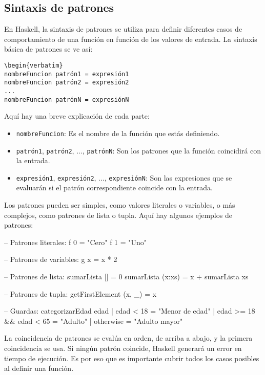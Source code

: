\documentclass{article}
\begin{document}
\subsection{Sintaxis de patrones}

En Haskell, la sintaxis de patrones se utiliza para definir diferentes casos de comportamiento de una función en función de los valores de entrada. La sintaxis básica de patrones se ve así:

\begin{verbatim}
\begin{verbatim}
nombreFuncion patrón1 = expresión1
nombreFuncion patrón2 = expresión2
...
nombreFuncion patrónN = expresiónN
\end{verbatim}

Aquí hay una breve explicación de cada parte:

\begin{itemize}
    \item \texttt{nombreFuncion}: Es el nombre de la función que estás definiendo.
    \item \texttt{patrón1}, \texttt{patrón2}, ..., \texttt{patrónN}: Son los patrones que la función coincidirá con la entrada.
    \item \texttt{expresión1}, \texttt{expresión2}, ..., \texttt{expresiónN}: Son las expresiones que se evaluarán si el patrón correspondiente coincide con la entrada.
\end{itemize}

Los patrones pueden ser simples, como valores literales o variables, o más complejos, como patrones de lista o tupla. Aquí hay algunos ejemplos de patrones:

\begin{haskell}[caption={Ejemplos de patrones en Haskell}]
-- Patrones literales:
f 0 = "Cero"
f 1 = "Uno"

-- Patrones de variables:
g x = x * 2

-- Patrones de lista:
sumarLista [] = 0
sumarLista (x:xs) = x + sumarLista xs

-- Patrones de tupla:
getFirstElement (x, _) = x

-- Guardas:
categorizarEdad edad
    | edad < 18 = "Menor de edad"
    | edad >= 18 && edad < 65 = "Adulto"
    | otherwise = "Adulto mayor"
\end{haskell}

La coincidencia de patrones se evalúa en orden, de arriba a abajo, y la primera coincidencia se usa. Si ningún patrón coincide, Haskell generará un error en tiempo de ejecución. Es por eso que es importante cubrir todos los casos posibles al definir una función.
\end{document}
